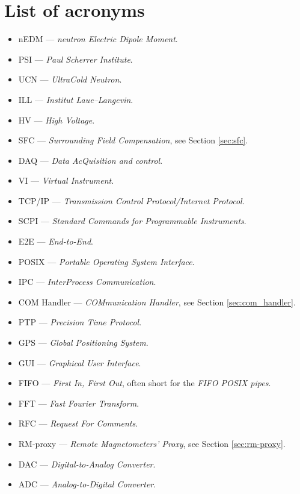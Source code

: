 \chapter*{List of acronyms}

\begin{itemize}
	\setlength\itemsep{-0.1em}
	\item nEDM --- \textit{neutron Electric Dipole Moment}.
	\item PSI --- \textit{Paul Scherrer Institute}.
	\item UCN --- \textit{UltraCold Neutron}.
	\item ILL --- \textit{Institut Laue–Langevin}.
	\item HV --- \textit{High Voltage}.
	\item SFC --- \textit{Surrounding Field Compensation}, see Section \ref{sec:sfc}.
	\item DAQ --- \textit{Data AcQuisition and control}.
	\item VI --- \textit{Virtual Instrument}.
	\item TCP/IP --- \textit{Transmission Control Protocol/Internet Protocol}.
	\item SCPI --- \textit{Standard Commands for Programmable Instruments}.
	\item E2E --- \textit{End-to-End}.
	\item POSIX --- \textit{Portable Operating System Interface}.
	\item IPC --- \textit{InterProcess Communication}.
	\item COM Handler --- \textit{COMmunication Handler}, see Section \ref{sec:com_handler}.
	\item PTP --- \textit{Precision Time Protocol}.
	\item GPS --- \textit{Global Positioning System}.
	\item GUI --- \textit{Graphical User Interface}.
	\item FIFO --- \textit{First In, First Out}, often short for the \textit{FIFO POSIX pipes}.
	\item FFT --- \textit{Fast Fourier Transform}.
	\item RFC --- \textit{Request For Comments}.
	\item RM-proxy --- \textit{Remote Magnetometers' Proxy}, see Section \ref{sec:rm-proxy}.
	\item DAC --- \textit{Digital-to-Analog Converter}.
	\item ADC --- \textit{Analog-to-Digital Converter}.
\end{itemize}
